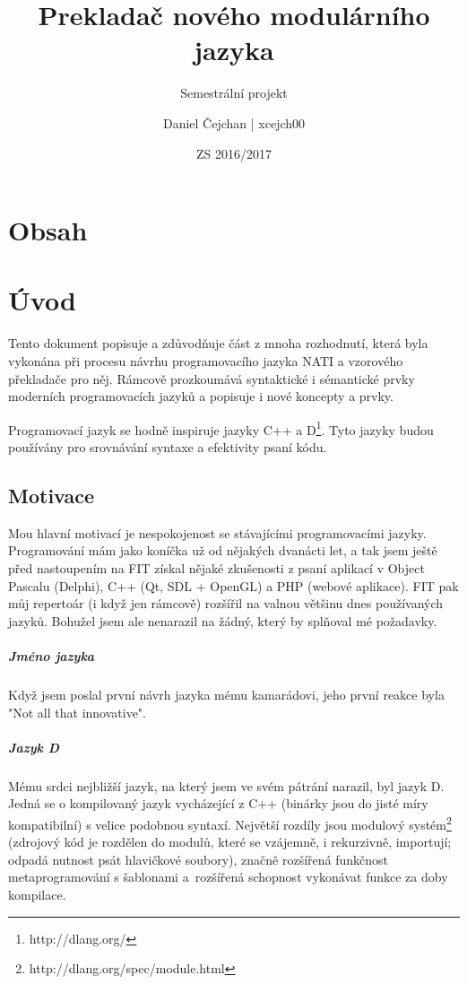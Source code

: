 




\setlength\extrarowheight{2pt}

\title{Prekladač nového modulárního jazyka}
\subtitle{Semestrální projekt}
\author{Daniel Čejchan | xcejch00}
\date{ZS 2016/2017}



\mainpage

\chapter{Obsah}
\makeatletter
{}
\makeatother

\chapter{Úvod}
Tento dokument popisuje a zdůvodňuje část z mnoha rozhodnutí, která byla vykonána při procesu návrhu programovacího jazyka NATI a vzorového překladače pro něj. Rámcově prozkoumává syntaktické i sémantické prvky moderních programovacích jazyků a popisuje i nové koncepty a prvky.

Programovací jazyk se hodně inspiruje jazyky C++ a D\footnote{http://dlang.org/}. Tyto jazyky budou používány pro srovnávání syntaxe a efektivity psaní kódu.

\section{Motivace}
Mou hlavní motivací je nespokojenost se stávajícími programovacími jazyky. Programování mám jako koníčka už od nějakých dvanácti let, a tak jsem ještě před nastoupením na FIT získal nějaké zkušenosti z psaní aplikací v Object Pascalu (Delphi), C++ (Qt, SDL + OpenGL) a PHP (webové aplikace). FIT pak můj repertoár (i když jen rámcově) rozšířil na valnou většinu dnes používaných jazyků. Bohužel jsem ale nenarazil na žádný, který by splňoval mé požadavky.

\paragraph{Jméno jazyka}
Když jsem poslal první návrh jazyka mému kamarádovi, jeho první reakce byla "Not all that innovative".

\paragraph{Jazyk D}
Mému srdci nejbližší jazyk, na který jsem ve svém pátrání narazil, byl jazyk D. Jedná se o kompilovaný jazyk vycházející z C++ (binárky jsou do jisté míry kompatibilní) s velice podobnou syntaxí. Největší rozdíly jsou modulový systém\footnote{http://dlang.org/spec/module.html} (zdrojový kód je rozdělen do modulů, které se vzájemně, i rekurzivně, importují; odpadá nutnost psát hlavičkové soubory), značně rozšířená funkčnost metaprogramování s šablonami a~rozšířená schopnost vykonávat funkce za doby kompilace.

